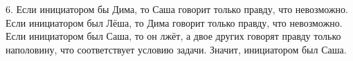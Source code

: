 6. Если инициатором бы Дима, то Саша говорит только правду, что невозможно. Если инициатором был Лёша, то  Дима говорит только правду, что невозможно. Если инициатором был Саша, то он лжёт, а двое других говорят правду только наполовину, что соответствует условию задачи. Значит, инициатором был Саша.\\
